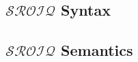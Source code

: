 \subsection{\texorpdfstring{$\mathcal{SROIQ}$}{SROIQ} Syntax} \label{sroiq-syntax}



\subsection{\texorpdfstring{$\mathcal{SROIQ}$}{SROIQ} Semantics} \label{sroiq-semantics}



